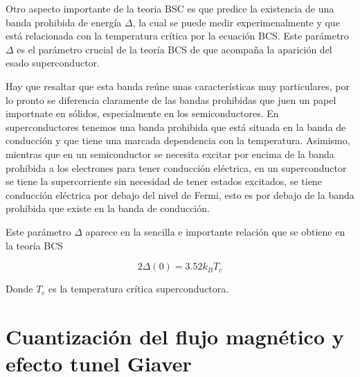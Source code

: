Otro aspecto importante de la teoria BSC es que predice la existencia de una banda prohibida de energía $\Delta$, la cual se puede medir experimenalmente y que está relacionada con la temperatura crítica por la ecuación BCS. Este parámetro $\Delta$ es el parámetro crucial de la teoría BCS de que acompaña la aparición del esado superconductor.

Hay que resaltar que esta banda reúne unas características muy particulares, por lo pronto se diferencia claramente de las bandas prohibidas que juen un papel importnate en sólidos, especialmente en los semiconductores. En superconductores tenemos una banda prohibida que está situada en la banda de conducción y que tiene una marcada dependencia con la temperatura. Asimismo, mientras que en un semiconductor se necesita excitar por encima de la banda prohibida a los electrones para tener conducción eléctrica, en un superconductor se tiene la supercorriente sin necesidad de tener estados excitados, se tiene conducción eléctrica por debajo del nivel de Fermi, esto es por debajo de la banda prohibida que existe en la banda de conducción.

Este parámetro $\Delta$ aparece en la sencilla e importante relación que se obtiene en la teoría BCS

\begin{equation}
    2 \Delta(0) = 3.52 k_B T_c
\end{equation}

Donde $T_c$ es la temperatura crítica superconductora.

\section{Cuantización del flujo magnético y efecto tunel Giaver}

